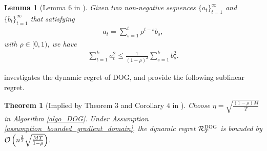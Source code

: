 \documentclass{article}
\newtheorem{Theorem}{\bf{Theorem}}
\newtheorem{Lemma}{\bf{Lemma}}
\begin{document}
\begin{Lemma}[Lemma $6$ in \citep{Tang:2018un}]
\label{Lemma_hanlin_2}
Given two non-negative sequences $\{a_t\}_{t=1}^{\infty}$ and $\{b_t\}_{t=1}^{\infty}$ that satisfying
\begin{align}
\nonumber
a_t = \sum_{s=1}^t \rho^{t-s} b_s,
\end{align} with $\rho \in [0,1)$, we have
\begin{align}
\nonumber
\sum_{t=1}^k a_t^2 \le \frac{1}{(1-\rho)^2}\sum_{s=1}^k b_s^2.
\end{align}
\end{Lemma}


\citet{8015179Shahram} investigates the dynamic regret of DOG, and provide the following sublinear regret.
\begin{Theorem}[Implied by Theorem $3$ and Corollary $4$ in \citet{8015179Shahram}]
\label{theorem_privious_dog_regret}
Choose $\eta = \sqrt{\frac{(1-\rho) M}{T}}$ in Algorithm \ref{algo_DOG}. Under Assumption \ref{assumption_bounded_gradient_domain}, the dynamic regret ${\mathcal{R}}_T^{\textsc{DOG}}$ is bounded by ${\mathcal{O}\left( n^{\frac{3}{2}}\sqrt{\frac{MT}{1-\rho}}  \right)}$.
\end{Theorem}
\end{document}

